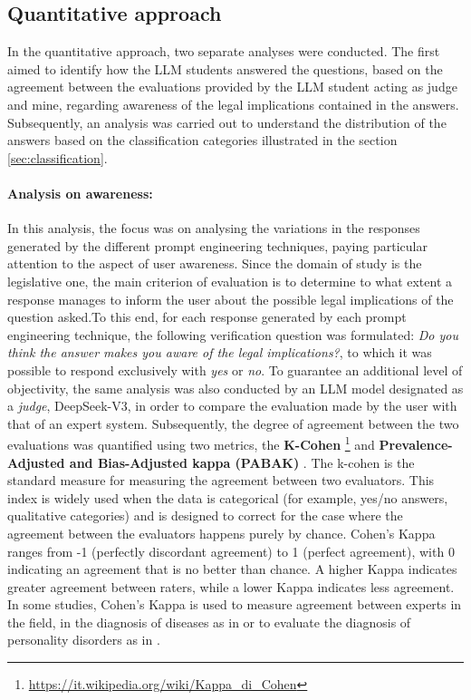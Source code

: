 \subsection{Quantitative approach}
In the quantitative approach, two separate analyses were conducted. The first aimed to identify how the LLM students answered the questions, based on the agreement between the evaluations provided by the LLM student acting as judge and mine, regarding awareness of the legal implications contained in the answers. Subsequently, an analysis was carried out to understand the distribution of the answers based on the classification categories illustrated in the section \ref{sec:classification}.
\paragraph{Analysis on awareness:} 
In this analysis, the focus was on analysing the variations in the responses generated by the different prompt engineering techniques, paying particular attention to the aspect of user awareness. Since the domain of study is the legislative one, the main criterion of evaluation is to determine to what extent a response manages to inform the user about the possible legal implications of the question asked.To this end, for each response generated by each prompt engineering technique, the following verification question was formulated: \textit{Do you think the answer makes you aware of the legal implications?}, to which it was possible to respond exclusively with \textit{yes} or \textit{no}. To guarantee an additional level of objectivity, the same analysis was also conducted by an LLM model designated as a \textit{judge}, DeepSeek-V3, in order to compare the evaluation made by the user with that of an expert system.
Subsequently, the degree of agreement between the two evaluations was quantified using two metrics, the \textbf{K-Cohen} \footnote{\url{https://it.wikipedia.org/wiki/Kappa_di_Cohen}} and \textbf{Prevalence-Adjusted and Bias-Adjusted kappa (PABAK)} \cite{Pabak}.
The k-cohen is the standard measure for measuring the agreement between two evaluators. This index is widely used when the data is categorical (for example, yes/no answers, qualitative categories) and is designed to correct for the case where the agreement between the evaluators happens purely by chance. Cohen's Kappa ranges from -1 (perfectly discordant agreement) to 1 (perfect agreement), with 0 indicating an agreement that is no better than chance. A higher Kappa indicates greater agreement between raters, while a lower Kappa indicates less agreement.
In some studies, Cohen's Kappa is used to measure agreement between experts in the field, in the diagnosis of diseases as in \cite{wongpakaran2013comparison} or to evaluate the diagnosis of personality disorders as in \cite{luciano2019field}.\\
